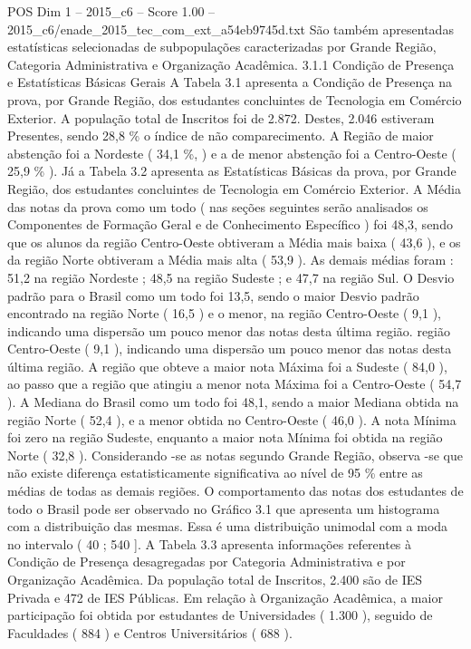 \begin{textsample}{POS Dim 1 – 2015\_c6 – Score 1.00 – 2015\_c6/enade\_2015\_tec\_com\_ext\_a54eb9745d.txt}
São também apresentadas estatísticas selecionadas de subpopulações caracterizadas por Grande Região, Categoria Administrativa e Organização Acadêmica. 3.1.1 Condição de Presença e Estatísticas Básicas Gerais A Tabela 3.1 apresenta a Condição de Presença na prova, por Grande Região, dos estudantes concluintes de Tecnologia em Comércio Exterior.
A população total de Inscritos foi de 2.872.
Destes, 2.046 estiveram Presentes, sendo 28,8 \% o índice de não comparecimento.
A Região de maior abstenção foi a Nordeste ( 34,1 \%, ) e a de menor abstenção foi a Centro-Oeste ( 25,9 \% ).
Já a Tabela 3.2 apresenta as Estatísticas Básicas da prova, por Grande Região, dos estudantes concluintes de Tecnologia em Comércio Exterior.
A Média das notas da prova como um todo ( nas seções seguintes serão analisados os Componentes de Formação Geral e de Conhecimento Específico ) foi 48,3, sendo que os alunos da região Centro-Oeste obtiveram a Média mais baixa ( 43,6 ), e os da região Norte obtiveram a Média mais alta ( 53,9 ).
As demais médias foram : 51,2 na região Nordeste ; 48,5 na região Sudeste ; e 47,7 na região Sul.
O Desvio padrão para o Brasil como um todo foi 13,5, sendo o maior Desvio padrão encontrado na região Norte ( 16,5 ) e o menor, na região Centro-Oeste ( 9,1 ), indicando uma dispersão um pouco menor das notas desta última região. região Centro-Oeste ( 9,1 ), indicando uma dispersão um pouco menor das notas desta última região.
A região que obteve a maior nota Máxima foi a Sudeste ( 84,0 ), ao passo que a região que atingiu a menor nota Máxima foi a Centro-Oeste ( 54,7 ).
A Mediana do Brasil como um todo foi 48,1, sendo a maior Mediana obtida na região Norte ( 52,4 ), e a menor obtida no Centro-Oeste ( 46,0 ).
A nota Mínima foi zero na região Sudeste, enquanto a maior nota Mínima foi obtida na região Norte ( 32,8 ).
Considerando -se as notas segundo Grande Região, observa -se que não existe diferença estatisticamente significativa ao nível de 95 \% entre as médias de todas as demais regiões.
O comportamento das notas dos estudantes de todo o Brasil pode ser observado no Gráfico 3.1 que apresenta um histograma com a distribuição das mesmas.
Essa é uma distribuição unimodal com a moda no intervalo ( 40 ; 540 ].
A Tabela 3.3 apresenta informações referentes à Condição de Presença desagregadas por Categoria Administrativa e por Organização Acadêmica.
Da população total de Inscritos, 2.400 são de IES Privada e 472 de IES Públicas.
Em relação à Organização Acadêmica, a maior participação foi obtida por estudantes de Universidades ( 1.300 ), seguido de Faculdades ( 884 ) e Centros Universitários ( 688 ).

\end{textsample}
